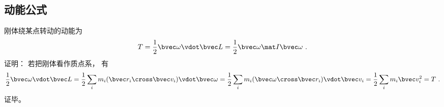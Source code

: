 \subsection{动能公式}
刚体绕某点转动的动能为
\begin{equation}\label{eq_RBKE_1}
T = \frac{1}{2}\bvec \omega \vdot \bvec L = \frac{1}{2}\bvec \omega \mat I \bvec\omega~.
\end{equation}
证明： 若把刚体看作质点系， 有
\begin{equation}
\frac{1}{2}\bvec \omega \vdot \bvec L = \frac{1}{2} \sum_i m_i (\bvec r_i\cross \bvec v_i)\vdot \bvec \omega = \frac{1}{2} \sum_i m_i (\bvec \omega \cross \bvec r_i)\vdot \bvec v_i = \frac{1}{2} \sum_i m_i \bvec v_i^2 = T~.
\end{equation}
证毕。
